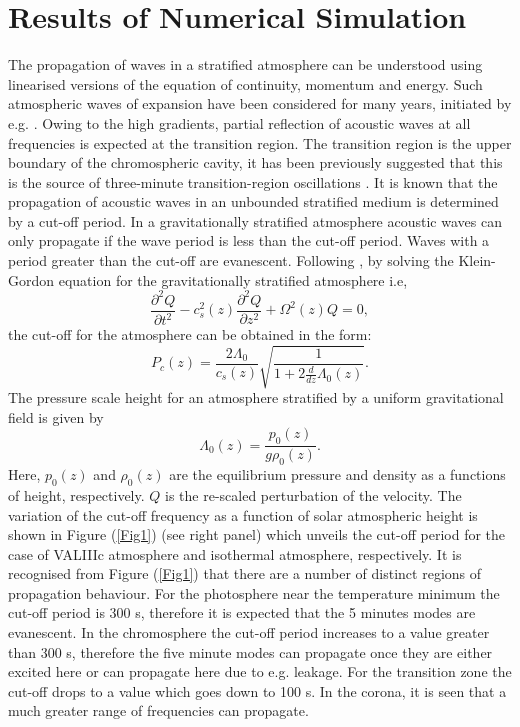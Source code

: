 \documentclass[preprint,authoryear,12pt]{elsarticle}
\begin{document}
\section{Results of Numerical Simulation}

The propagation of waves in a stratified atmosphere can be understood using linearised versions of the 
equation of continuity, momentum and energy. Such atmospheric waves of expansion have been 
considered for many years, initiated by e.g. \citet{Lamb1932}. Owing to the high gradients, partial 
reflection of acoustic waves at all frequencies is expected at the transition region. The transition region 
is the upper boundary of the chromospheric cavity, it has been previously suggested that this is the source 
of three-minute transition-region oscillations \citet{Leibacher1971}. It is known that the propagation of 
acoustic waves in an unbounded stratified medium is determined by a cut-off period. In a gravitationally 
stratified atmosphere acoustic waves can only propagate if the wave period is less than the cut-off period. 
Waves with a period greater than the cut-off are evanescent. Following \citet{Taroyan2008}, by solving the 
Klein-Gordon equation for the gravitationally stratified atmosphere i.e, 
$$
\frac{\partial^2 Q}{\partial t^2} - c_s^2(z) \frac{\partial^2 Q}{\partial z^2} + \Omega^2(z)Q = 0,
$$
the cut-off for the atmosphere can be obtained in the form:
$$
P_{c}(z)=\frac{2\Lambda_0   }{ c_{s}(z)}   \sqrt{\frac{1}{1+2\frac{d}{dz}\Lambda_0(z)}}.
$$
The pressure scale height for an atmosphere stratified by a uniform gravitational field is given by
$$
\Lambda_0(z)=\frac{p_0(z)}{g\rho_0(z)}.
$$
Here, $p_0(z)$ and $\rho_0(z)$ are the equilibrium pressure and density as a functions of height, respectively. $Q$ is the 
re-scaled perturbation of the velocity. The variation of the cut-off frequency as a function of solar atmospheric height is shown in 
Figure (\ref{Fig1}) (see right panel) which unveils the cut-off period for the case of VALIIIc atmosphere and isothermal 
atmosphere, respectively. It is recognised from Figure (\ref{Fig1}) that there are a number of distinct 
regions of propagation behaviour. For the photosphere near the temperature minimum the cut-off period is 300 s, therefore 
it is expected that the 5 minutes modes are evanescent. In the chromosphere the cut-off period increases to a value greater than 300 s, 
therefore the five minute modes can propagate once they are either excited here or can propagate here due to e.g. leakage. For the transition zone the cut-off drops to a value which goes down to 100 s. In the corona, it is seen that a much greater range of frequencies can propagate.
\end{document}

